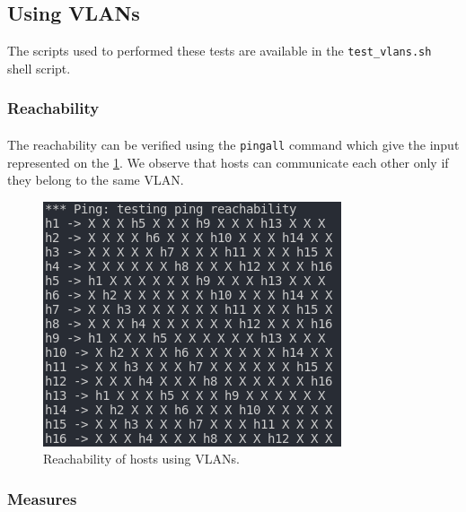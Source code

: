 \documentclass[a4paper, 11pt, oneside]{article}
\begin{document}
\subsection{Using VLANs}
The scripts used to performed these tests are available in the \texttt{test\_vlans.sh} shell script.
\subsubsection{Reachability}

\paragraph{}The reachability can be verified using the \texttt{pingall} command which give the input represented on the \ref{VLANs_reach}. We observe that hosts can communicate each other only if they belong to the same VLAN.

\begin{figure}[H]
\center
\includegraphics[scale = 2]{VLANs/VLANs_reach.png}
\caption{Reachability of hosts using VLANs.}
\label{VLANs_reach}
\end{figure}

\subsubsection{Measures}
\end{document}
